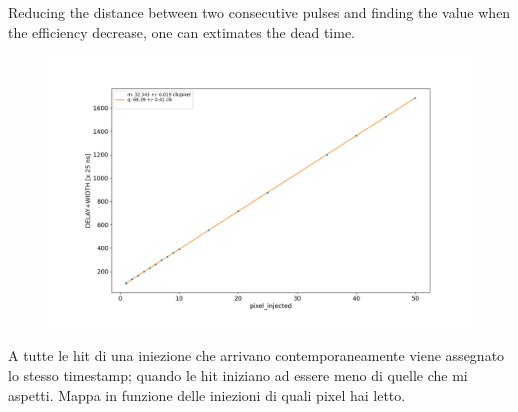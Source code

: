         Reducing the distance between two consecutive pulses and finding the value when the efficiency decrease, one can extimates the dead time. 

        \begin{figure}[h!]
                \centering
                \includegraphics[width=.7\linewidth]{figures/Monopix1/dead_time.png}
                \caption{}
                \label{fig:dead_time}
            \end{figure}
        A tutte le hit di una iniezione che arrivano contemporaneamente viene assegnato lo stesso timestamp; quando le hit iniziano ad essere meno di quelle che mi aspetti.
        Mappa in funzione delle iniezioni di quali pixel hai letto.
        
    
